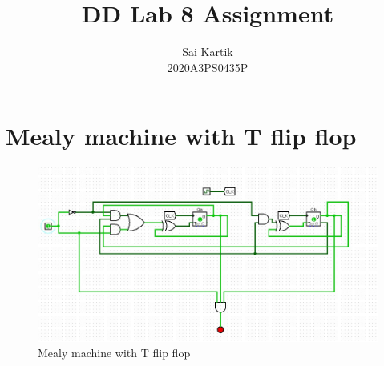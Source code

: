 \documentclass[12pt]{article}
\title{DD Lab 8 Assignment}
\author{Sai Kartik \\2020A3PS0435P}
\begin{document}
    \maketitle
    \section{Mealy machine with T flip flop}
    \begin{figure}[ht]
        \centering
        \includegraphics[scale=0.75]{ss.jpg}
        \caption{Mealy machine with T flip flop}
    \end{figure}
\end{document}

